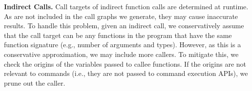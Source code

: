\noindent
{\bf Indirect Calls.} 
Call targets of indirect function calls are determined at runtime. As  are not included in the call graphs we generate, they may cause inaccurate results.
To handle this problem, given an indirect call, we conservatively assume that the call target can be any functions in the program that have the same function signature (e.g., number of arguments and types).
%
However, as this is a conservative approximation, we may include more callers. 
%
To mitigate this, we check the origins of the variables passed to callee functions. If the origins are not relevant to commands (i.e., they are not passed to command execution APIs), we prune out the caller. 



